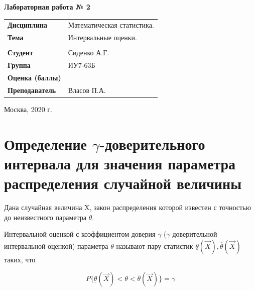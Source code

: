 \documentclass[a4paper,14pt]{extreport} %
\begin{document}
\begin{titlepage}
    \vspace{2cm}

    \begin{center}
        \textbf{Лабораторная работа № 2} \\
        \vspace{0.5cm}
    \end{center}

    \vspace{4cm}

    \begin{flushleft}
        \begin{tabular}{ll}
            \textbf{Дисциплина} & Математическая статистика.  \\
            \textbf{Тема} & Интервальные оценки.   \\
            \\
            \textbf{Студент} & Сиденко А.Г. \\
            \textbf{Группа} & ИУ7-63Б \\
            \textbf{Оценка (баллы)} & \\
            \textbf{Преподаватель} & Власов П.А.   \\
        \end{tabular}
    \end{flushleft}

    \vspace{4cm}

   \begin{center}
        Москва, 2020 г.
    \end{center}

\end{titlepage}

\section{Определение $\gamma$-доверительного интервала для значения параметра распределения случайной величины}

\hfill 

Дана случайная величина X, закон распределения которой известен с точностью до неизвестного параметра $\theta$. 

Интервальной оценкой с коэффициентом доверия $\gamma$ ($\gamma$-доверительной интервальной оценкой) параметра $\theta$ называют пару статистик $\underline{\theta}(\vec X), \overline{\theta}(\vec X)$ таких, что

$$P\{\underline{\theta}(\vec X)< \theta< \overline{\theta}(\vec X)\}=\gamma$$ 
\end{document}
